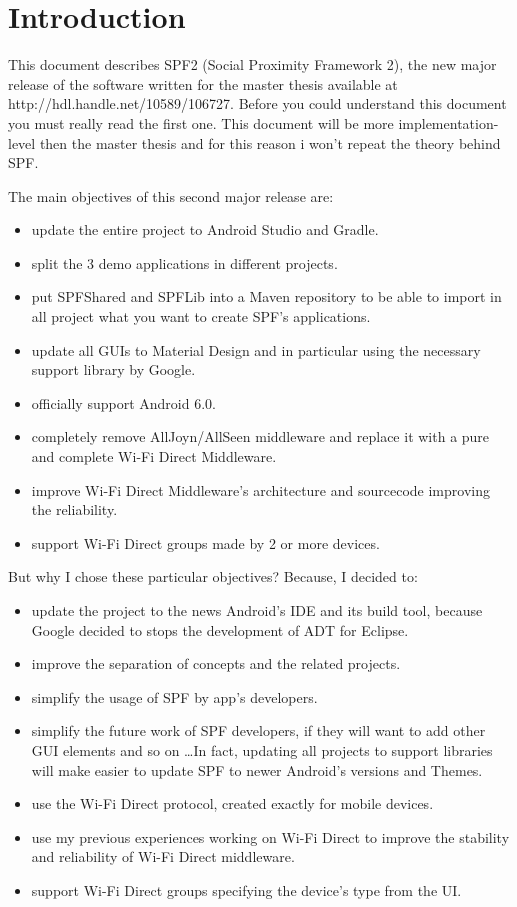 \chapter{Introduction}
\label{chap1}

This document describes SPF2 (Social Proximity Framework 2), the new major release of the software written for the master thesis available at http://hdl.handle.net/10589/106727. Before you could understand this document you must really read the first one. This document will be more implementation-level then the master thesis and for this reason i won't repeat the theory behind SPF.

\noindent The main objectives of this second major release are:
\begin{itemize}
	\item update the entire project to Android Studio and Gradle.
	\item split the 3 demo applications in different projects.
	\item put \textsf{SPFShared} and \textsf{SPFLib} into a Maven repository to be able to import in all project what you want to create SPF's applications.
	\item update all GUIs to Material Design and in particular using the necessary support library by Google.
	\item officially support Android 6.0.
	\item completely remove AllJoyn/AllSeen middleware and replace it with a pure and complete Wi-Fi Direct Middleware.
	\item improve Wi-Fi Direct Middleware's architecture and sourcecode improving the reliability.
	\item support Wi-Fi Direct groups made by 2 or more devices.
\end{itemize}

\noindent But why I chose these particular objectives? Because, I decided to:
\begin{itemize}
	\item update the project to the news Android's IDE and its build tool, because Google decided to stops the development of ADT for Eclipse.
	\item improve the separation of concepts and the related projects.
	\item simplify the usage of SPF by app's developers.
	\item simplify the future work of SPF developers, if they will want to add other GUI elements and so on \dots In fact, updating all projects to support libraries will make easier to update SPF to newer Android's versions and Themes.
	\item use the Wi-Fi Direct protocol, created exactly for mobile devices.
	\item use my previous experiences working on Wi-Fi Direct to improve the stability and reliability of Wi-Fi Direct middleware.
	\item support Wi-Fi Direct groups specifying the device's type from the UI.
\end{itemize}


